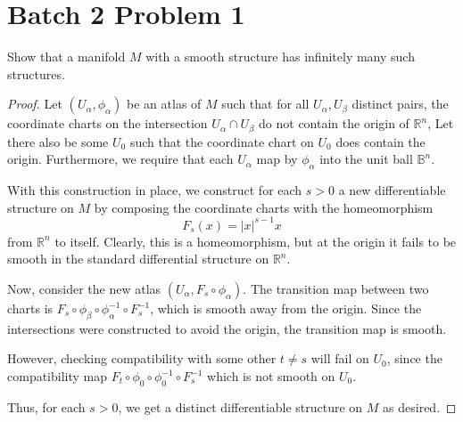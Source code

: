 \documentclass[fontsize=11pt]{scrartcl} %
\numberwithin{equation}{section} %
\numberwithin{figure}{section} %
\numberwithin{table}{section} %
\begin{document}
\section*{Batch 2 Problem 1}
Show that a manifold $M$ with a smooth structure has infinitely many such structures.
\\
\begin{proof}
Let $(U_{\alpha}, \phi_{\alpha})$ be an atlas of $M$ such that for all $U_{\alpha},U_{\beta}$
distinct pairs, the coordinate charts on the intersection $U_{\alpha}\cap U_{\beta}$ do not
contain the origin of $\mathbb{R}^n$, Let there also be some $U_0$ such that the coordinate
chart on $U_0$ does contain the origin. Furthermore, we require that each $U_{\alpha}$ map
by $\phi_{\alpha}$ into the unit ball $\mathbb{B}^n$.

With this construction in place, we construct for each $s>0$ a new differentiable structure
on $M$ by composing the coordinate charts with the homeomorphism
\[
F_s(x) = |x|^{s-1}x
\]
from $\mathbb{R}^n$ to itself. Clearly, this is a homeomorphism, but at the origin it fails
to be smooth in the standard differential structure on $\mathbb{R}^n$.

Now, consider the new atlas $(U_{\alpha},F_s\circ\phi_{\alpha})$. The transition map
between two charts is $F_s\circ\phi_{\beta}\circ\phi_{\alpha}^{-1}\circ F_s^{-1}$, which is
smooth away from the origin. Since the intersections were constructed to avoid the origin, the
transition map is smooth.

However, checking compatibility with some other $t\neq s$ will fail on $U_0$, since the compatibility map
$F_t\circ\phi_0\circ\phi_0^{-1}\circ F_s^{-1}$ which is not smooth on $U_0$.

Thus, for each $s>0$, we get a distinct differentiable structure on $M$ as desired.


\end{proof}
\end{document}
